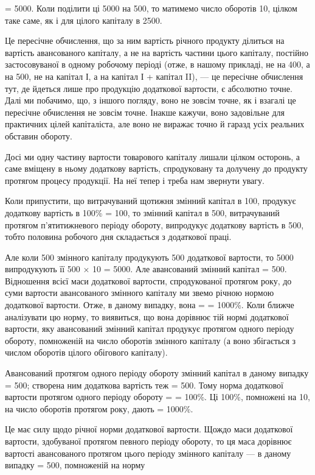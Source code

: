 \parcont{}  %
 = 5000. Коли поділити ці 5000 на 500, то матимемо число оборотів 10,
цілком таке саме, як і для цілого капіталу в 2500.

Це пересічне обчислення, що за ним вартість річного продукту ділиться на вартість авансованого
капіталу, а не на вартість частини цього капіталу, постійно застосовуваної в одному робочому періоді
(отже, в нашому прикладі, не на 400, а на 500, не на капітал І, а на капітал І + капітал II), — це
пересічне обчислення тут, де йдеться лише про продукцію додаткової вартости, є абсолютно точне. Далі
ми побачимо, що, з іншого погляду, воно не зовсім точне, як і взагалі це пересічне обчислення не
зовсім точне. Інакше кажучи, воно задовільне для практичних цілей капіталіста,
але воно не виражає точно й гаразд усіх реальних обставин обороту.

Досі ми одну частину вартости товарового капіталу лишали цілком осторонь, а саме вміщену в ньому
додаткову вартість, спродуковану та долучену до продукту протягом процесу продукції. На неї тепер і
треба нам звернути увагу.

Коли припустити, що витрачуваний щотижня змінний капітал в 100, продукує додаткову
вартість в 100\% = 100, то змінний капітал в 500,  витрачуваний протягом
п’ятитижневого періоду обороту, випродукує додаткову вартість в 500, тобто половина
робочого дня складається з додаткової праці.

Але коли 500 змінного капіталу продукують 500 додаткової вартости, то 5000 випродукують її 500 × 10 = 5000. Але авансований змінний капітал = 500.
Відношення всієї маси додаткової вартости, спродукованої протягом року, до суми вартости
авансованого змінного капіталу ми звемо річною нормою додаткової вартости. Отже, в даному випадку,
вона =  = 1000\%.
Коли ближче аналізувати цю норму, то виявиться, що вона дорівнює тій нормі додаткової вартости, яку
авансований змінний капітал продукує протягом одного періоду обороту, помноженій на число оборотів
змінного капіталу (а воно збігається з числом оборотів цілого обігового капіталу).

Авансований протягом одного періоду обороту змінний капітал в даному випадку = 500;
створена ним додаткова вартість теж = 500. Тому норма додаткової вартости протягом одного
періоду обороту =  = 100\%. Ці 100\%, помножені на 10, на число оборотів протягом року,
дають  = 1000\%.

Це має силу щодо річної норми додаткової вартости. Щождо маси додаткової вартости, здобуваної
протягом певного періоду обороту, то ця маса дорівнює вартості авансованого протягом цього періоду
змінного капіталу — в даному випадку = 500, помноженій на норму
\parbreak{}  %
